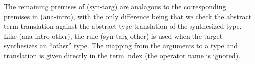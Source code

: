 \documentclass[10pt,preprint]{sigplanconf}
\newtheorem{lemma}{Lemma}
\newtheorem{definition}{Definition}
\begin{document}
The remaining premises of (syn-targ) are analagous to the corresponding premises in (ana-intro), with the only difference being that we check the abstract term translation against the abstract type translation of the synthesized type. Like (ana-intro-other), the rule (syn-targ-other) is used when the target synthesizes an ``other'' type. The mapping from the arguments to a type and translation is given directly in the term index (the operator name is ignored).






\end{document}
